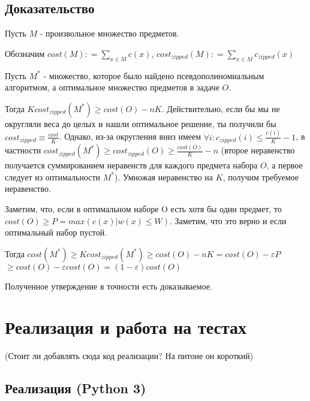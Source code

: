 \documentclass{article}
\begin{document}
	\subsection{Доказательство}
	
	Пусть $M$ - произвольное множество предметов.
	
	Обозначим $cost(M) : = \sum\limits_{x \in M} c(x)$,  $cost_{zipped}(M) : = \sum\limits_{x \in M} c_{zipped}(x)$
	
	Пусть $M^*$ - множество, которое было найдено псевдополиномиальным алгоритмом, а оптимальное множество предметов в задаче $O$.
	
	Тогда $K cost_{zipped}(M^*) \geq cost(O) -  nK$. Действительно, если бы мы не округляли веса до целых и нашли оптимальное решение, ты получили бы $ cost_{zipped} \equiv \frac{cost}{K}$. Однако, из-за округления вниз имеем  $\forall i: c_{zipped}(i) \leq \frac{c(i)}{K} - 1$, в частности $cost_{zipped}(M^*) \geq cost_{zipped}(O) \geq \frac{cost(O)}{K} - n$ (второе неравенство получается суммированием неравенств для каждого предмета набора $O$, а первое следует из оптимальности $M^*$). Умножая неравенство на $K$, получим требуемое неравенство.
	
	Заметим, что, если в оптимальном наборе O есть хотя бы один предмет, то 
	$cost(O) \geq P = max(c(x) | w(x) \leq W)$. Заметим, что это верно и если оптимальный набор пустой.
	
	Тогда $cost(M^*) \geq $$ K cost_{zipped} (M^*) \geq $$ cost(O) -  nK $$= cost(O) - \varepsilon P $$ \geq cost(O) - \varepsilon cost(O) $$ = (1 - \varepsilon) cost(O)$
	
	Полученное утверждение в точности есть доказываемое.
	
	
	
	
	
\section{Реализация и работа на тестах}
	(Стоит ли добавлять сюда код реализации? На питоне он короткий)
	\subsection{Реализация (Python 3)}
	
\end{document}
